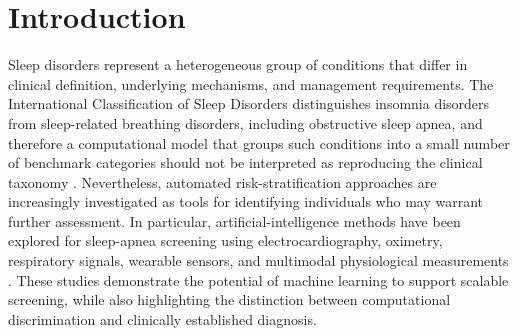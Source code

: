 \documentclass[a4paper,fleqn]{cas-dc}
\begin{document}

\maketitle

\section{Introduction}

Sleep disorders represent a heterogeneous group of conditions that differ in clinical definition, underlying mechanisms, and management requirements. The International Classification of Sleep Disorders distinguishes insomnia disorders from sleep-related breathing disorders, including obstructive sleep apnea, and therefore a computational model that groups such conditions into a small number of benchmark categories should not be interpreted as reproducing the clinical taxonomy \cite{aasm2023}. Nevertheless, automated risk-stratification approaches are increasingly investigated as tools for identifying individuals who may warrant further assessment. In particular, artificial-intelligence methods have been explored for sleep-apnea screening using electrocardiography, oximetry, respiratory signals, wearable sensors, and multimodal physiological measurements \cite{bazoukis2023,tyagi2023,abdalrazaq2024,giorgi2025}. These studies demonstrate the potential of machine learning to support scalable screening, while also highlighting the distinction between computational discrimination and clinically established diagnosis.
\end{document}
